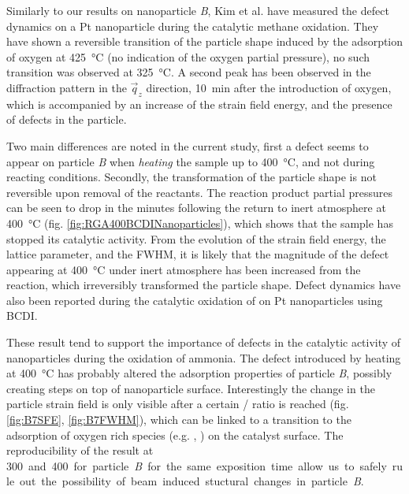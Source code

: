 Similarly to our results on nanoparticle \textit{B}, Kim et al. \parencite*{Kim2019} have measured the defect dynamics on a Pt nanoparticle during the catalytic methane oxidation.
They have shown a reversible transition of the particle shape induced by the adsorption of oxygen at \qty{425}{\degreeCelsius} (no indication of the oxygen partial pressure), no such transition was observed at \qty{325}{\degreeCelsius}.
A second peak has been observed in the diffraction pattern in the $\vec{q}_z$ direction, \qty{10}{\minute} after the introduction of oxygen, which is accompanied by an increase of the strain field energy, and the presence of defects in the particle.

Two main differences are noted in the current study, first a defect seems to appear on particle \textit{B} when \textit{heating} the sample up to \qty{400}{\degreeCelsius}, and not during reacting conditions.
Secondly, the transformation of the particle shape is not reversible upon removal of the reactants.
The reaction product partial pressures can be seen to drop in the minutes following the return to inert atmosphere at \qty{400}{\degreeCelsius} (fig. \ref{fig:RGA400BCDINanoparticles}), which shows that the sample has stopped its catalytic activity.
From the evolution of the strain field energy, the lattice parameter, and the FWHM, it is likely that the magnitude of the defect appearing at \qty{400}{\degreeCelsius} under inert atmosphere has been increased from the reaction, which irreversibly transformed the particle shape.
Defect dynamics have also been reported during the catalytic oxidation of  on Pt nanoparticles \parencite{Carnis2021b} using BCDI.

These result tend to support the importance of defects in the catalytic activity of nanoparticles during the oxidation of ammonia.
The defect introduced by heating at \qty{400}{\degreeCelsius} has probably altered the adsorption properties of particle \textit{B}, possibly creating steps on top of nanoparticle surface.
Interestingly the change in the particle strain field is only visible after a certain / ratio is reached (fig. \ref{fig:B7SFE}, \ref{fig:B7FWHM}), which can be linked to a transition to the adsorption of oxygen rich species (e.g. , ) on the catalyst surface.
The reproducibility of the result at \qty{300} and \qty{400} for particle \textit{B} for the same exposition time allow us to safely rule out the possibility of beam induced stuctural changes in particle \textit{B}.

